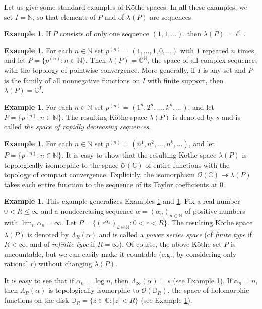\documentclass[12pt,reqno]{amsart}
\theoremstyle{definition}
\newtheorem{example}[theorem]{Example}
\begin{document}
Let us give some standard examples of K\"othe spaces. In all these examples,
we set $I={\mathbb N}$, so that elements of $P$ and of $\lambda(P)$ are sequences.

\begin{example}
\label{example:l1}
If $P$ consists of only one sequence $(1,1,\ldots)$, then $\lambda(P)=\ell^1$.
\end{example}

\begin{example}
For each $n\in{\mathbb N}$ set $p^{(n)}=(1,\ldots ,1,0,\ldots)$ with $1$ repeated $n$ times,
and let $P=\{ p^{(n)} : n\in{\mathbb N}\}$. Then $\lambda(P)={\mathbb C}^{\mathbb N}$, the space of all complex
sequences with the topology of pointwise convergence.
More generally, if $I$ is any set and $P$ is the family of all nonnegative
functions on $I$ with finite support, then $\lambda(P)={\mathbb C}^I$.
\end{example}

\begin{example}
\label{example:s}
For each $n\in{\mathbb N}$ set $p^{(n)}=(1^n,2^n,\ldots ,k^n,\ldots)$,
and let $P=\{ p^{(n)} : n\in{\mathbb N}\}$. The resulting K\"othe space $\lambda(P)$ is denoted
by $s$ and is called {\em the space of rapidly decreasing sequences}.
\end{example}

\begin{example}
\label{example:O(C)}
For each $n\in{\mathbb N}$ set $p^{(n)}=(n^1,n^2,\ldots ,n^k,\ldots)$,
and let $P=\{ p^{(n)} : n\in{\mathbb N}\}$. It is easy to show that the resulting
K\"othe space $\lambda(P)$ is topologically isomorphic to the space
${\mathscr O}({\mathbb C})$ of entire functions with the topology of compact convergence.
Explicitly, the isomorphism ${\mathscr O}({\mathbb C})\to\lambda(P)$ takes each entire function
to the sequence of its Taylor coefficients at $0$.
\end{example}

\begin{example}
\label{example:pow_ser}
This example generalizes Examples \ref{example:s} and \ref{example:O(C)}.
Fix a real number $0<R\le\infty$ and a nondecreasing sequence
$\alpha=(\alpha_n)_{n\in{\mathbb N}}$ of positive numbers with $\lim_n\alpha_n=\infty$.
Let $P=\{ (r^{\alpha_k})_{k\in{\mathbb N}} : 0<r<R\}$. The resulting K\"othe space $\lambda(P)$
is denoted by $\Lambda_R(\alpha)$ and is called a {\em power series space}
(of \emph{finite type} if $R<\infty$, and of \emph{infinite type} if $R=\infty$).
Of course, the above K\"othe set $P$ is uncountable, but
we can easily make it countable (e.g., by considering only rational $r$)
without changing $\lambda(P)$.

It is easy to see that if $\alpha_n=\log n$, then $\Lambda_\infty(\alpha)=s$
(see Example \ref{example:s}). If $\alpha_n=n$, then
$\Lambda_R(\alpha)$ is topologically isomorphic to ${\mathscr O}({\mathbb D}_R)$, the space
of holomorphic functions on the disk ${\mathbb D}_R=\{ z\in{\mathbb C} : |z|<R\}$
(see Example \ref{example:O(C)}).
\end{example}
\end{document}
